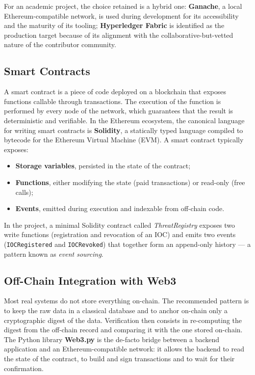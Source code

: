 \documentclass[12pt,a4paper,oneside]{book}
\begin{document}
{{For an academic project, the choice retained is a hybrid one: \textbf{Ganache},
a local Ethereum-compatible network, is used during development for its
accessibility and the maturity of its tooling; \textbf{Hyperledger Fabric}
is identified as the production target because of its alignment with the
collaborative-but-vetted nature of the contributor community.

\subsection{Smart Contracts}

A smart contract is a piece of code deployed on a blockchain that exposes
functions callable through transactions. The execution of the function is
performed by every node of the network, which guarantees that the result is
deterministic and verifiable. In the Ethereum ecosystem, the canonical
language for writing smart contracts is \textbf{Solidity}, a statically
typed language compiled to bytecode for the Ethereum Virtual Machine (EVM).
A smart contract typically exposes:

\begin{itemize}
\item \textbf{Storage variables}, persisted in the state of the contract;
\item \textbf{Functions}, either modifying the state (paid transactions) or
read-only (free calls);
\item \textbf{Events}, emitted during execution and indexable from
off-chain code.
\end{itemize}

In the project, a minimal Solidity contract called \textit{ThreatRegistry}
exposes two write functions (registration and revocation of an IOC) and
emits two events (\texttt{IOCRegistered} and \texttt{IOCRevoked}) that
together form an append-only history --- a pattern known as \emph{event
sourcing}.

\subsection{Off-Chain Integration with Web3}

Most real systems do not store everything on-chain. The recommended pattern
is to keep the raw data in a classical database and to anchor on-chain only
a cryptographic digest of the data. Verification then consists in
re-computing the digest from the off-chain record and comparing it with the
one stored on-chain. The Python library \textbf{Web3.py} is the de-facto
bridge between a backend application and an Ethereum-compatible network: it
allows the backend to read the state of the contract, to build and sign
transactions and to wait for their confirmation.

}}
\end{document}
